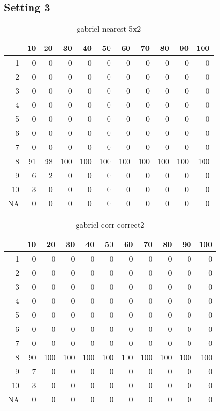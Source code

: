 \documentclass[11pt]{article}
\begin{document}
\subsection*{Setting 3}

\begin{table}[H]
\centering
\begin{tabular}{rrrrrrrrrrr}
  \hline
 & 10 & 20 & 30 & 40 & 50 & 60 & 70 & 80 & 90 & 100 \\ 
  \hline
1 & 0 & 0 & 0 & 0 & 0 & 0 & 0 & 0 & 0 & 0 \\ 
  2 & 0 & 0 & 0 & 0 & 0 & 0 & 0 & 0 & 0 & 0 \\ 
  3 & 0 & 0 & 0 & 0 & 0 & 0 & 0 & 0 & 0 & 0 \\ 
  4 & 0 & 0 & 0 & 0 & 0 & 0 & 0 & 0 & 0 & 0 \\ 
  5 & 0 & 0 & 0 & 0 & 0 & 0 & 0 & 0 & 0 & 0 \\ 
  6 & 0 & 0 & 0 & 0 & 0 & 0 & 0 & 0 & 0 & 0 \\ 
  7 & 0 & 0 & 0 & 0 & 0 & 0 & 0 & 0 & 0 & 0 \\ 
  8 & 91 & 98 & 100 & 100 & 100 & 100 & 100 & 100 & 100 & 100 \\ 
  9 & 6 & 2 & 0 & 0 & 0 & 0 & 0 & 0 & 0 & 0 \\ 
  10 & 3 & 0 & 0 & 0 & 0 & 0 & 0 & 0 & 0 & 0 \\ 
  NA & 0 & 0 & 0 & 0 & 0 & 0 & 0 & 0 & 0 & 0 \\ 
   \hline
\end{tabular}
\caption{gabriel-nearest-5x2} 
\end{table}
\begin{table}[H]
\centering
\begin{tabular}{rrrrrrrrrrr}
  \hline
 & 10 & 20 & 30 & 40 & 50 & 60 & 70 & 80 & 90 & 100 \\ 
  \hline
1 & 0 & 0 & 0 & 0 & 0 & 0 & 0 & 0 & 0 & 0 \\ 
  2 & 0 & 0 & 0 & 0 & 0 & 0 & 0 & 0 & 0 & 0 \\ 
  3 & 0 & 0 & 0 & 0 & 0 & 0 & 0 & 0 & 0 & 0 \\ 
  4 & 0 & 0 & 0 & 0 & 0 & 0 & 0 & 0 & 0 & 0 \\ 
  5 & 0 & 0 & 0 & 0 & 0 & 0 & 0 & 0 & 0 & 0 \\ 
  6 & 0 & 0 & 0 & 0 & 0 & 0 & 0 & 0 & 0 & 0 \\ 
  7 & 0 & 0 & 0 & 0 & 0 & 0 & 0 & 0 & 0 & 0 \\ 
  8 & 90 & 100 & 100 & 100 & 100 & 100 & 100 & 100 & 100 & 100 \\ 
  9 & 7 & 0 & 0 & 0 & 0 & 0 & 0 & 0 & 0 & 0 \\ 
  10 & 3 & 0 & 0 & 0 & 0 & 0 & 0 & 0 & 0 & 0 \\ 
  NA & 0 & 0 & 0 & 0 & 0 & 0 & 0 & 0 & 0 & 0 \\ 
   \hline
\end{tabular}
\caption{gabriel-corr-correct2} 
\end{table}
\end{document}
